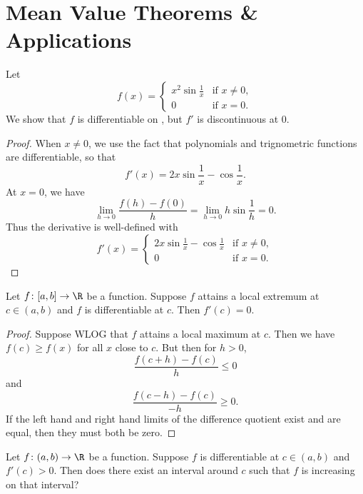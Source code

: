 \section{Mean Value Theorems \& Applications} \label{sec:mvt}
\begin{example}
    Let \[
        f(x) = \begin{cases}
            x^2 \sin \frac1x & \text{if } x \ne 0, \\
            0 & \text{if } x = 0.
        \end{cases}
    \]
    We show that $f$ is differentiable on \R, but $f'$ is discontinuous
    at $0$.
    \begin{proof}
        When $x \ne 0$, we use the fact that polynomials and trignometric
        functions are differentiable, so that \[
            f'(x) = 2x \sin \frac1x - \cos \frac1x.
        \] At $x = 0$, we have \[
            \lim_{h \to 0} \frac{f(h) - f(0)}{h}
            = \lim_{h \to 0} h \sin \frac1h = 0.
        \] Thus the derivative is well-defined with \[
            f'(x) = \begin{cases}
                2x \sin \frac1x - \cos \frac1x & \text{if } x \ne 0, \\
                0 & \text{if } x = 0.
            \end{cases}
        \]
    \end{proof}
\end{example}

\begin{theorem} \label{thm:stationary}
    Let $f\colon [a, b] \to \R$ be a function.
    Suppose $f$ attains a local extremum at $c \in (a, b)$ and $f$ is
    differentiable at $c$.
    Then $f'(c) = 0$.
\end{theorem}
\begin{proof}
    Suppose WLOG that $f$ attains a local maximum at $c$.
    Then we have $f(c) \ge f(x)$ for all $x$ close to $c$.
    But then for $h > 0$, \[
        \frac{f(c + h) - f(c)}{h} \le 0
    \] and \[
        \frac{f(c - h) - f(c)}{-h} \ge 0.
    \] If the left hand and right hand limits of the difference quotient
    exist and are equal, then they must both be zero.
\end{proof}

\begin{exercise}
    Let $f\colon (a, b) \to \R$ be a function.
    Suppose $f$ is differentiable at $c \in (a, b)$ and $f'(c) > 0$.
    Then does there exist an interval around $c$ such that $f$ is
    increasing on that interval?
\end{exercise}

